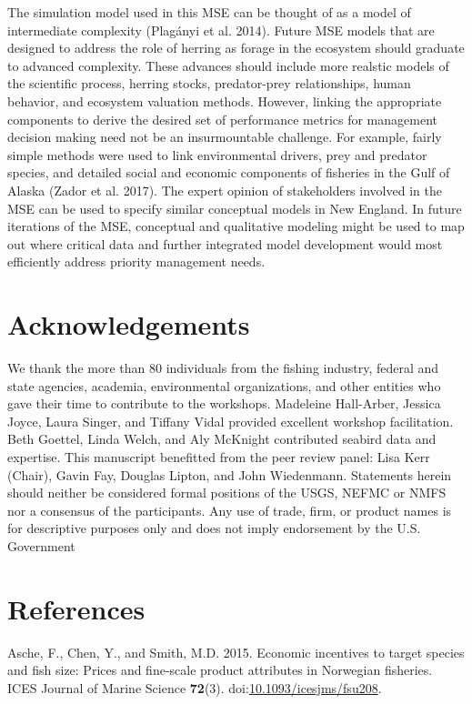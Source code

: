 \documentclass[]{article}
\begin{document}
The simulation model used in this MSE can be thought of as a model of
intermediate complexity (Plagányi et al. 2014). Future MSE models that
are designed to address the role of herring as forage in the ecosystem
should graduate to advanced complexity. These advances should include
more realstic models of the scientific process, herring stocks,
predator-prey relationships, human behavior, and ecosystem valuation
methods. However, linking the appropriate components to derive the
desired set of performance metrics for management decision making need
not be an insurmountable challenge. For example, fairly simple methods
were used to link environmental drivers, prey and predator species, and
detailed social and economic components of fisheries in the Gulf of
Alaska (Zador et al. 2017). The expert opinion of stakeholders involved
in the MSE can be used to specify similar conceptual models in New
England. In future iterations of the MSE, conceptual and qualitative
modeling might be used to map out where critical data and further
integrated model development would most efficiently address priority
management needs.

\section{Acknowledgements}\label{acknowledgements}

We thank the more than 80 individuals from the fishing industry, federal
and state agencies, academia, environmental organizations, and other
entities who gave their time to contribute to the workshops. Madeleine
Hall-Arber, Jessica Joyce, Laura Singer, and Tiffany Vidal provided
excellent workshop facilitation. Beth Goettel, Linda Welch, and Aly
McKnight contributed seabird data and expertise. This manuscript
benefitted from the peer review panel: Lisa Kerr (Chair), Gavin Fay,
Douglas Lipton, and John Wiedenmann. Statements herein should neither be
considered formal positions of the USGS, NEFMC or NMFS nor a consensus
of the participants. Any use of trade, firm, or product names is for
descriptive purposes only and does not imply endorsement by the U.S.
Government

\section{References}\label{references}

\hypertarget{refs}{}
\hypertarget{ref-Asche2015EconomicFisheries}{}
Asche, F., Chen, Y., and Smith, M.D. 2015. Economic incentives to target
species and fish size: Prices and fine-scale product attributes in
Norwegian fisheries. ICES Journal of Marine Science \textbf{72}(3).
doi:\href{https://doi.org/10.1093/icesjms/fsu208}{10.1093/icesjms/fsu208}.
\end{document}
